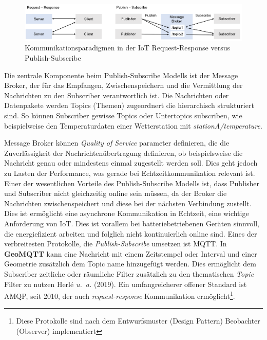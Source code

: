 \documentclass[
  11pt,
  a4paper,
  oneside, openany  ,captions=tableheading
]{scrbook}
\theoremstyle{remark}
\begin{document}
\begin{figure}[H]

{\centering \includegraphics{images/publish-subcribe_request-response.png}

}

\caption{Kommunikationsparadigmen in der IoT Request-Response versus
Publish-Subscribe}

\end{figure}%

Die zentrale Komponente beim Publish-Subscribe Modells ist der Message
Broker, der für das Empfangen, Zwischenspeichern und die Vermittlung der
Nachrichten zu den Subscriber verantwortlich ist. Die Nachrichten oder
Datenpakete werden Topics (Themen) zugeordnert die hierarchisch
strukturiert sind. So können Subscriber gewisse Topics oder Untertopics
subscriben, wie beispielweise den Temperaturdaten einer Wetterstation
mit \emph{stationA/temperature}.

Message Broker können \emph{Quality of Service} parameter definieren,
die die Zuverlässigkeit der Nachrichtenübertragung definieren, ob
beispielsweise die Nachricht genau oder mindestens einmal zugestellt
werden soll. Dies geht jedoch zu Lasten der Performance, was gerade bei
Echtzeitkommunikation relevant ist. Einer der wesentlichen Vorteile des
Publish-Subscribe Modells ist, dass Publisher und Subscriber nicht
gleichzeitig online sein müssen, da der Broker die Nachrichten
zwischenspeichert und diese bei der nächsten Verbindung zustellt. Dies
ist ermöglicht eine asynchrone Kommunikation in Echtzeit, eine wichtige
Anforderung von IoT. Dies ist vorallem bei batteriebetriebenen Geräten
sinnvoll, die energiefizient arbeiten und folglich nicht kontinuierlich
online sind. Eines der verbreitesten Protokolle, die
\emph{Publish-Subscribe} umsetzen ist MQTT. In \textbf{GeoMQTT} kann
eine Nachricht mit einem Zeitstempel oder Interval und einer Geometrie
zusätzlich dem Topic name hinzugefügt werden. Dies ermöglicht dem
Subscriber zeitliche oder räumliche Filter zusätzlich zu den
thematischen \emph{Topic} Filter zu nutzen Herlé \emph{u.~a.} (2019).
Ein umfangreicherer offener Standard ist AMQP, seit 2010, der auch
\emph{request-response} Kommunikation ermöglicht\footnote{Diese
  Protokolle sind nach dem Entwurfsmuster (Design Pattern) Beobachter
  (Observer) implementiert}.
\end{document}
